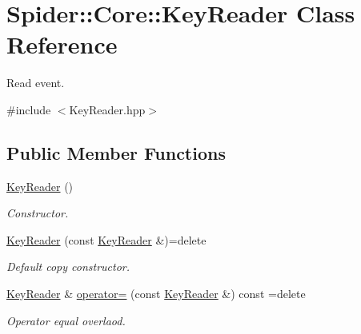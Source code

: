 \hypertarget{class_spider_1_1_core_1_1_key_reader}{}\section{Spider\+:\+:Core\+:\+:Key\+Reader Class Reference}
\label{class_spider_1_1_core_1_1_key_reader}


Read event.  




{\ttfamily \#include $<$Key\+Reader.\+hpp$>$}

\subsection*{Public Member Functions}
\begin{DoxyCompactItemize}
\item 
\mbox{\label{class_spider_1_1_core_1_1_key_reader_a4d56368d7bd01a455130d6fb1f342463}} 
\hyperlink{class_spider_1_1_core_1_1_key_reader_a4d56368d7bd01a455130d6fb1f342463}{Key\+Reader} ()
\begin{DoxyCompactList}\small\item\em Constructor. \end{DoxyCompactList}\item 
\mbox{\label{class_spider_1_1_core_1_1_key_reader_ace2bf54fcbd10aea76f3afe0dc50c802}} 
\hyperlink{class_spider_1_1_core_1_1_key_reader_ace2bf54fcbd10aea76f3afe0dc50c802}{Key\+Reader} (const \hyperlink{class_spider_1_1_core_1_1_key_reader}{Key\+Reader} \&)=delete
\begin{DoxyCompactList}\small\item\em Default copy constructor. \end{DoxyCompactList}\item 
\hyperlink{class_spider_1_1_core_1_1_key_reader}{Key\+Reader} \& \hyperlink{class_spider_1_1_core_1_1_key_reader_a17eaa634915bdca4e3e32bac7a0bad39}{operator=} (const \hyperlink{class_spider_1_1_core_1_1_key_reader}{Key\+Reader} \&) const =delete
\begin{DoxyCompactList}\small\item\em Operator equal overlaod. \end{DoxyCompactList}\item 
\mbox{\label{class_spider_1_1_core_1_1_key_reader_a7792d49fd03445cfdd3b72ad6a5009cb}} 

\end{DoxyCompactItemize}
